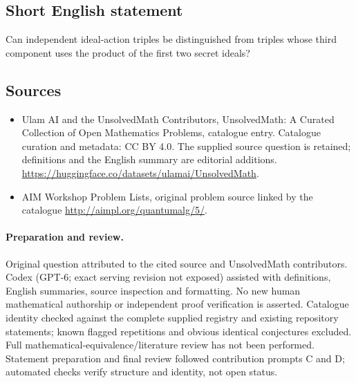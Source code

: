 \documentclass[11pt]{article}
\begin{document}
\subsection{Short English statement}
Can independent ideal-action triples be distinguished from triples whose third component uses the product of the first two secret ideals?
\subsection{Sources}
\begin{itemize}
\item[\hypertarget{source:statement:1}{S1}] Ulam AI and the UnsolvedMath Contributors, UnsolvedMath: A Curated Collection of Open Mathematics Problems, catalogue entry. Catalogue curation and metadata: CC BY 4.0. The supplied source question is retained; definitions and the English summary are editorial additions.
\url{https://huggingface.co/datasets/ulamai/UnsolvedMath}.
\item[\hypertarget{source:statement:2}{S2}] AIM Workshop Problem Lists, original problem source linked by the catalogue
\url{http://aimpl.org/quantumalg/5/}.
\end{itemize}
\paragraph{Preparation and review.}
Original question attributed to the cited source and UnsolvedMath contributors. Codex (GPT-6; exact serving revision not exposed) assisted with definitions, English summaries, source inspection and formatting. No new human mathematical authorship or independent proof verification is asserted. Catalogue identity checked against the complete supplied registry and existing repository statements; known flagged repetitions and obvious identical conjectures excluded. Full mathematical-equivalence/literature review has not been performed. Statement preparation and final review followed contribution prompts C and D; automated checks verify structure and identity, not open status.
\label{end:statement}
\end{document}
